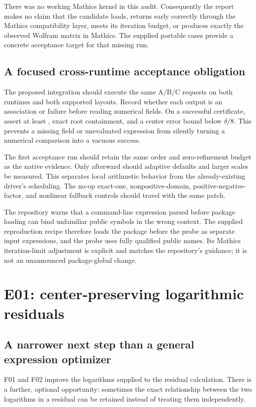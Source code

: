 \documentclass[11pt,letterpaper]{article}
\newcommand{\code}[1]{\texttt{\detokenize{#1}}}
\theoremstyle{remark}\newtheorem{remark}[proposition]{Remark}
\begin{document}
There was no working Mathics kernel in this audit. Consequently the report
makes no claim that the candidate loads, returns early correctly through the
Mathics compatibility layer, meets its iteration budget, or produces exactly
the observed Wolfram matrix in Mathics. The supplied portable cases provide a
concrete acceptance target for that missing run.

\subsection{A focused cross-runtime acceptance obligation}
The proposed integration should execute the same A/B/C requests on both
runtimes and both supported layouts. Record whether each output is an
association or failure before reading numerical fields. On a successful
certificate, assert at least \code{Certified === True}, exact root
containment, and a center error bound below $\delta/8$. This prevents a
missing field or unevaluated expression from silently turning a numerical
comparison into a vacuous success.

The first acceptance run should retain the same order and zero-refinement
budget as the native evidence. Only afterward should adaptive defaults and
larger scales be measured. This separates local arithmetic behavior from the
already-existing driver's scheduling. The no-op exact-one, nonpositive-domain,
positive-negative-factor, and nonlinear fallback controls should travel with
the same patch.

The repository warns that a command-line expression parsed before package
loading can bind unfamiliar public symbols in the wrong context. The
supplied reproduction recipe therefore loads the package before the probe
as separate input expressions, and the probe uses fully qualified public
names. Its Mathics iteration-limit adjustment is explicit and matches the
repository's guidance; it is not an unannounced package-global change.
\cite{mathicscompat}

\section{E01: center-preserving logarithmic residuals}
\subsection{A narrower next step than a general expression optimizer}
F01 and F02 improve the logarithms supplied to the residual calculation.
There is a further, optional opportunity: sometimes the exact relationship
between the two logarithms in a residual can be retained instead of treating
them independently.
\end{document}
